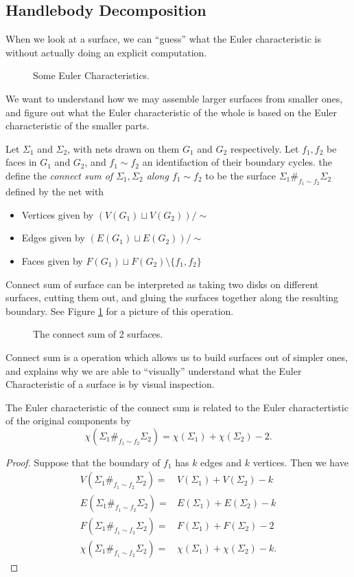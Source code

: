 \subsection{Handlebody Decomposition}
When we look at a surface, we can ``guess'' what the Euler characteristic is without actually doing an explicit computation. 
\begin{figure}[h]
\centering

\caption{Some Euler Characteristics.}
\end{figure}
We want to understand how we may assemble larger surfaces from smaller ones, and figure out what the Euler characteristic of the whole is based on the Euler characteristic of the smaller parts. 
\begin{definition}Let $\Sigma_1$ and $\Sigma_2$, with nets drawn on them $G_1$ and $G_2$ respectively. Let $f_1, f_2$ be faces in $G_1$ and $G_2$, and $f_1\sim f_2$ an identifaction of their boundary cycles.  the define the \emph{connect sum of $\Sigma_1, \Sigma_2$ along $f_1\sim f_2$} to be the surface $\Sigma_1\#_{f_1\sim f_2} \Sigma_2$ defined by the net with  
\begin{itemize}
\item Vertices given by $(V(G_1)\sqcup V(G_2))/\sim$
\item Edges given by $(E(G_1)\sqcup E(G_2))/\sim$
\item Faces given by $F(G_1)\sqcup F(G_2)\setminus \{f_1, f_2\}$
\end{itemize}
\end{definition}
Connect sum of surface can be interpreted as taking two disks on different surfaces, cutting them out, and gluing the surfaces together along the resulting boundary. See Figure \ref{fig:connectsum} for a picture of this operation. 
\begin{figure}
\centering

\caption{The connect sum of 2 surfaces.}
\label{fig:connectsum}
\end{figure}
Connect sum is a operation which allows us to build surfaces out of simpler ones, and explains why we are able to ``visually'' understand what the Euler Characteristic of a surface is by visual inspection.
\begin{claim}
The Euler characteristic of the connect sum is related to the Euler charactertistic of the original components by 
\[\chi(\Sigma_1\#_{f_1\sim f_2} \Sigma_2)=\chi(\Sigma_1)+\chi(\Sigma_2)-2.\]
\end{claim}
\begin{proof}
Suppose that the boundary of $f_1$ has $k$ edges and $k$ vertices. Then we have 
\begin{align*}
V(\Sigma_1\#_{f_1\sim f_2} \Sigma_2)=&V(\Sigma_1)+V(\Sigma_2)-k\\
E(\Sigma_1\#_{f_1\sim f_2} \Sigma_2)=&E(\Sigma_1)+E(\Sigma_2)-k\\
F(\Sigma_1\#_{f_1\sim f_2} \Sigma_2)=&F(\Sigma_1)+F(\Sigma_2)-2\\
\chi(\Sigma_1\#_{f_1\sim f_2} \Sigma_2)=&\chi(\Sigma_1)+\chi(\Sigma_2)-k.
\end{align*}
\end{proof}
